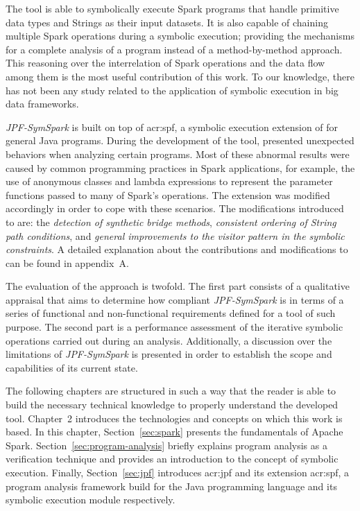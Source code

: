 The tool is able to symbolically execute Spark programs that handle primitive data types and Strings as their input datasets. It is also capable of chaining multiple Spark operations during a symbolic execution; providing the mechanisms for a complete analysis of a program instead of a method-by-method approach. This reasoning over the interrelation of Spark operations and the data flow among them is the most useful contribution of this work. To our knowledge, there has not been any study related to the application of symbolic execution in big data frameworks.

\textit{JPF-SymSpark} is built on top of \acrfull{acr:spf}, a symbolic execution extension of \jpf{} for general Java programs. During the development of the tool, \spf{} presented unexpected behaviors when analyzing certain programs. Most of these abnormal results were caused by common programming practices in Spark applications, for example, the use of anonymous classes and lambda expressions to represent the parameter functions passed to many of Spark's operations. The \spf{} extension was modified accordingly in order to cope with these scenarios. The modifications introduced to \spf{} are: the \textit{detection of synthetic bridge methods}, \textit{consistent ordering of String path conditions}, and \textit{general improvements to the visitor pattern in the symbolic constraints}. A detailed explanation about the contributions and modifications to \spf{} can be found in appendix~A.

The evaluation of the approach is twofold. The first part consists of a qualitative appraisal that aims to determine how compliant \textit{JPF-SymSpark} is in terms of a series of functional and non-functional requirements defined for a tool of such purpose. The second part is a performance assessment of the iterative symbolic operations carried out during an analysis. Additionally, a discussion over the limitations of \textit{JPF-SymSpark} is presented in order to establish the scope and capabilities of its current state.


The following chapters are structured in such a way that the reader is able to build the necessary technical knowledge to properly understand the developed tool. Chapter~2 introduces the technologies and concepts on which this work is based. In this chapter, Section~\ref{sec:spark} presents the fundamentals of Apache Spark. Section~\ref{sec:program-analysis} briefly explains program analysis as a verification technique and provides an introduction to the concept of symbolic execution. Finally, Section~\ref{sec:jpf} introduces \acrlong{acr:jpf} and its extension \acrlong{acr:spf}, a program analysis framework build for the Java programming language and its symbolic execution module respectively.


